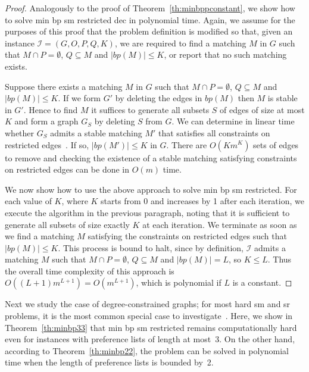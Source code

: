 \documentclass[preprint,12pt]{elsarticle}
\begin{document}
\begin{proof} Analogously to the proof of Theorem~\ref{th:minbppconstant}, we show how to solve {\sc min bp sm restricted dec} in polynomial time.  Again, we assume for the purposes of this proof that the problem definition is modified so that, given an instance $\mathcal{I} = (G, O, P, Q, K)$, we are required to find a matching $M$ in $G$ such that $M\cap P=\emptyset$, $Q\subseteq M$ and $|bp(M)|\leq K$, or report that no such matching exists.


Suppose there exists a matching $M$ in $G$ such that $M\cap P=\emptyset$, $Q\subseteq M$ and $|bp(M)|\leq K$.  If we form $G'$ by deleting the edges in $bp(M)$ then $M$ is stable in $G'$.  Hence to find $M$ it suffices to generate all subsets $S$ of edges of size at most $K$ and form a graph $G_S$ by deleting $S$ from $G$.  We can determine in linear time whether $G_S$ admits a stable matching $M'$ that satisfies all constraints on restricted edges~\cite{DFFS03}.  If so, $|bp(M')|\leq K$ in $G$.  There are $O(Km^K)$ sets of edges to remove and checking the existence of a stable matching satisfying constraints on restricted edges can be done in $O(m)$ time.

We now show how to use the above approach to solve {\sc min bp sm restricted}.  For each value of $K$, where $K$ starts from 0 and increases by 1 after each iteration, we execute the algorithm in the previous paragraph, noting that it is sufficient to generate all subsets of size exactly $K$ at each iteration.  We terminate as soon as we find a matching $M$ satisfying the constraints on restricted edges such that $|bp(M)|\leq K$.  This process is bound to halt, since by definition, $\mathcal I$ admits a matching $M$ such that $M\cap P=\emptyset$, $Q\subseteq M$ and $|bp(M)|=L$, so $K\leq L$.  Thus the overall time complexity of this approach is $O((L+1)m^{L+1})=O(m^{L+1})$, which is polynomial if $L$ is a constant.
\end{proof}

Next we study the case of degree-constrained graphs; for most hard {\sc sm} and {\sc sr} problems, it is the most common special case to investigate~\cite{IMO09,HIM09,BMM12}. Here, we show in Theorem~\ref{th:minbp33} that {\sc min bp sm restricted} remains computationally hard even for instances with preference lists of length at most~3. On the other hand, according to Theorem~\ref{th:minbp22}, the problem can be solved in polynomial time when the length of preference lists is bounded by~2. 
\end{document}
